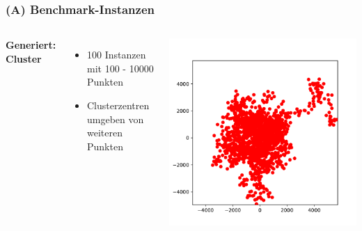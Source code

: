\documentclass[aspectratio=169]{beamer}
\begin{document}
\begin{frame}
	\frametitle{(A) Benchmark-Instanzen}
	\begin{columns}[c] %
	
	\textbf{Generiert: Cluster}
	\begin{itemize}
		\item 100 Instanzen mit 100 - 10000 Punkten
		\item Clusterzentren umgeben von weiteren Punkten
	\end{itemize}
	
	\includegraphics[scale=.5]{cluster_big.pdf}
	

	\end{columns}
	\end{frame}

\end{document}
